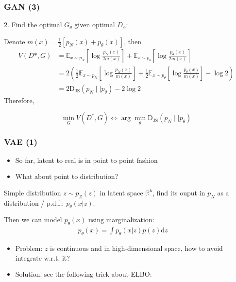 \documentclass{beamer}
\begin{document}
\begin{frame}[t]
\frametitle{GAN (3)}
2. Find the optimal $G_\theta$ given optimal $D_\phi$:

Denote $m(x)=\displaystyle\frac{1}{2}[p_N(x)+p_\theta(x)]$, then 
\begin{align*}
    V(D*, G)&=\mathbb{E}_{x\sim p_N}\left[\log\frac{p_N(x)}{2m(x)}\right]+\mathbb{E}_{x\sim p_\theta}\left[\log\frac{p_\theta(x)}{2m(x)}\right]\\
    &=2\left(\frac{1}{2}\mathbb{E}_{x\sim p_N}\left[\log\frac{p_N(x)}{m(x)}\right]+\frac{1}{2}\mathbb{E}_{x\sim p_\theta}\left[\log\frac{p_\theta(x)}{m(x)}\right]-\log2\right)\\
    &=2\mathrm{D_{JS}}(p_N\mid\mid p_\theta) - 2\log2
\end{align*}
Therefore,
\begin{tcolorbox}[colback=blue!1!white,
                  colframe=blue!75!black]
$$
\min_GV(D^*,G)\Longleftrightarrow\arg\min_\theta \mathrm{D_{JS}}(p_N\mid\mid p_\theta)
$$
\end{tcolorbox}

\end{frame}

\begin{frame}[t]
\frametitle{VAE (1)}
\begin{itemize}
    \item So far, latent to real is in point to point fashion
    \item What about point to distribution?
\end{itemize}
\vspace{1em}

Simple distribution $z\sim p_Z(z)$ in latent space $\mathbb{R}^k$, find its ouput in $p_N$ as a distribution / p.d.f.:
$p_\theta(x|z)$.
\vspace{1em}

Then we can model $p_\theta(x)$ using marginalization:
\begin{align*}
p_\theta(x)=\int p_\theta(x|z)p(z)\text{d}z\quad\tag{**}
\end{align*}
\begin{itemize}
    \item Problem: $z$ is continuous and in high-dimensional space, how to avoid integrate w.r.t. it?
    \item Solution: see the following trick about ELBO:
\end{itemize}
\end{frame}
\end{document}
